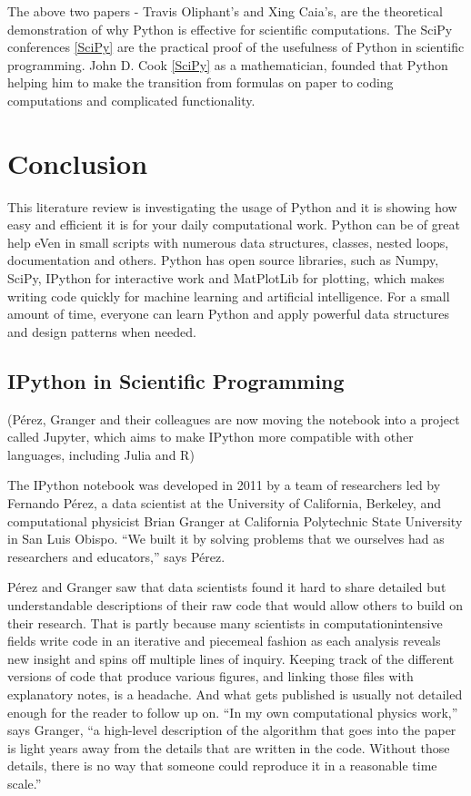 The above two papers - Travis Oliphant's  and Xing Caia's, are the theoretical demonstration of why Python is effective for scientific computations. The SciPy conferences \ref{SciPy} are the practical proof of the usefulness of Python in scientific programming. John D. Cook \ref{SciPy} as a mathematician, founded that Python helping him to make the transition from formulas on paper to coding computations and complicated functionality. 

\section{Conclusion}
This literature review is investigating the usage of Python and it is showing how easy and efficient it is for your daily computational work. Python can be of great help eVen in small scripts with numerous data structures, classes, nested loops, documentation and others. Python has open source libraries, such as Numpy, SciPy, IPython for interactive work and MatPlotLib for plotting, which makes writing code quickly for machine learning and artificial intelligence. For a small amount of time, everyone can learn Python and apply powerful data structures and design patterns when needed.



\subsection{IPython in Scientific Programming}

(Pérez,
Granger and their colleagues are now moving
the notebook into a project called Jupyter, which
aims to make IPython more compatible with
other languages, including Julia and R)

The IPython notebook was developed in 2011
by a team of researchers led by Fernando Pérez,
a data scientist at the University of California,
Berkeley, and computational physicist Brian
Granger at California Polytechnic State University
in San Luis Obispo. “We built it by solving
problems that we ourselves had as researchers
and educators,” says Pérez.

Pérez and Granger saw that data scientists
found it hard to share detailed but understandable
descriptions of their raw code that would
allow others to build on their research. That is
partly because many scientists in computationintensive
fields write code in an iterative and
piecemeal fashion as each analysis reveals new
insight and spins off multiple lines of inquiry.
Keeping track of the different versions of code
that produce various figures, and linking those
files with explanatory notes, is a headache.
And what gets published is usually not detailed
enough for the reader to follow up on. “In my
own computational physics work,” says Granger,
“a high-level description of the algorithm that
goes into the paper is light years away from
the details that are written in the code. Without
those details, there is no way that someone
could reproduce it in a reasonable time scale.”

